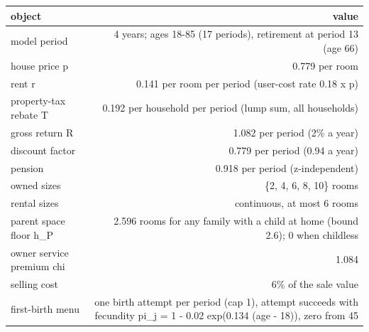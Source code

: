 \begingroup\small
\setlength{\tabcolsep}{3pt}
\renewcommand{\arraystretch}{1.04}
\begin{tabularx}{\linewidth}{Xr}
\toprule
object & value \\
\midrule
model period & 4 years; ages 18-85 (17 periods), retirement at period 13 (age 66) \\
house price p & 0.779 per room \\
rent r & 0.141 per room per period (user-cost rate 0.18 x p) \\
property-tax rebate T & 0.192 per household per period (lump sum, all households) \\
gross return R & 1.082 per period (2\% a year) \\
discount factor & 0.779 per period (0.94 a year) \\
pension & 0.918 per period (z-independent) \\
owned sizes & \{2, 4, 6, 8, 10\} rooms \\
rental sizes & continuous, at most 6 rooms \\
parent space floor h\_P & 2.596 rooms for any family with a child at home (bound 2.6); 0 when childless \\
owner service premium chi & 1.084 \\
selling cost & 6\% of the sale value \\
first-birth menu & one birth attempt per period (cap 1), attempt succeeds with fecundity pi\_j = 1 - 0.02 exp(0.134 (age - 18)), zero from 45 \\
\bottomrule
\end{tabularx}
\endgroup
